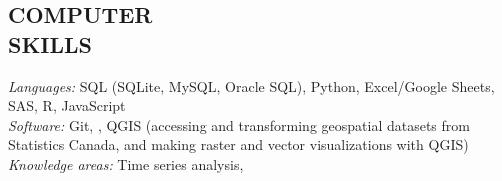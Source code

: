 \documentclass[margin, 10pt]{res} %
\begin{document}
\begin{resume}

\section{COMPUTER \\ SKILLS} 

{\sl Languages:} 
SQL (SQLite, MySQL, Oracle SQL), Python, Excel/Google Sheets, SAS, R, JavaScript \\

{\sl Software:}
Git, , QGIS (accessing and transforming geospatial datasets from Statistics Canada, and making raster and vector visualizations with QGIS)\\

{\sl Knowledge areas:}
Time series analysis, 

\end{resume}
\end{document}
